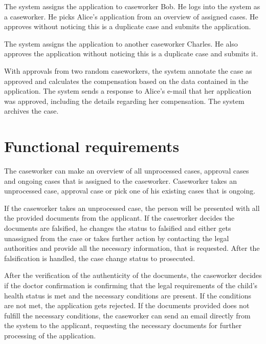 \documentclass{article}
\begin{document}
\vspace{2mm}

The system assigns the application to caseworker Bob. He logs into the system as a caseworker. He picks Alice's application from an overview of assigned cases. He approves without noticing this is a duplicate case and submits the application.

\vspace{2mm}

The system assigns the application to another caseworker Charles. He also approves the application without noticing this is a duplicate case and submits it.

\vspace{2mm}

With approvals from two random caseworkers, the system annotate the case as approved and calculates the compensation based on the data contained in the application. The system sends a response to Alice's e-mail that her application was approved, including the details regarding her compensation. The system archives the case.

\section{Functional requirements}


The caseworker can make an overview of all unprocessed cases, approval cases and ongoing cases that is assigned to the caseworker. Caseworker takes an unprocessed case, approval case or pick one of his existing cases that is ongoing.

If the caseworker takes an unprocessed case, the person will be presented with all the provided documents from the applicant. If the caseworker decides the documents are falsified, he changes the status to falsified and either gets unassigned from the case or takes further action by contacting the legal authorities and provide all the necessary information, that is requested. After the falsification is handled, the case change status to prosecuted.

After the verification of the authenticity of the documents, the caseworker decides if the doctor confirmation is confirming that the legal requirements of the child's health status is met and the necessary conditions are present. 
If the conditions are not met, the application gets rejected. 
If the documents provided does not fulfill the necessary conditions, the caseworker can send an email directly from the system to the applicant, requesting the necessary documents for further processing of the application.
\end{document}
